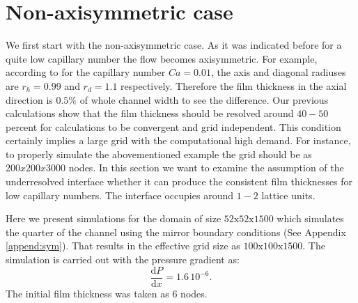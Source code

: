 \documentclass{article}
\begin{document}
\section{Non-axisymmetric case}
We first start with the non-axisymmetric case. As it was indicated before for a quite low capillary
number the flow becomes axisymmetric. For
example, according to \cite{heil-threedim} for the capillary
number $Ca=0.01$, the axis and diagonal radiuses are $r_h=0.99$ and $r_d=1.1$ respectively.
Therefore the film thickness in the axial direction is  $0.5\%$ of whole channel width to see the
difference. Our previous calculations \cite{kuzmin-binary2d} show that the film thickness should be
 resolved around $40-50$ percent for calculations to be convergent and grid independent. This
condition certainly implies a large grid with the computational high demand. For instance, to
properly simulate the abovementioned example the grid should be as 
$200x200x3000$ nodes. In this section we want to examine the assumption of the underresolved
interface whether it can produce the consistent film thicknesses for low capillary numbers. The
interface occupies around $1-2$ lattice units. 

Here we present simulations for the domain of size $52\mathrm{x}52\mathrm{x}1500$ which simulates
the quarter of the channel using the mirror boundary conditions (See Appendix \ref{append:sym}).
That
results in the effective grid size as $100\mathrm{x}100\mathrm{x}1500$. The simulation is carried
out with the pressure gradient as:
\begin{equation}
\frac{\mathrm{d}P}{\mathrm{d}x}=1.6\,10^{-6}.
\end{equation}
The initial film thickness was taken as $6$ nodes. 
\end{document}
